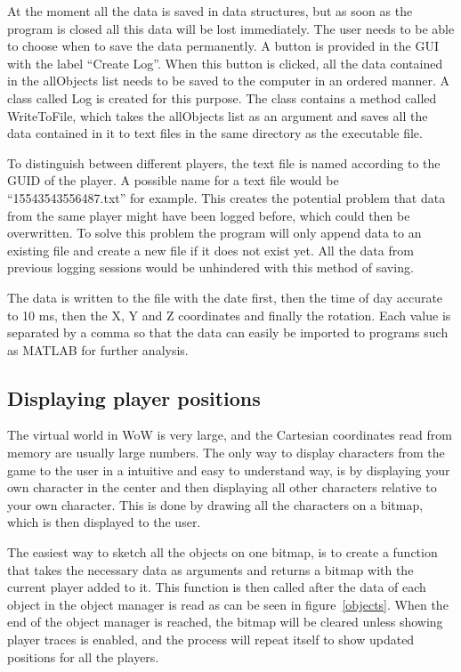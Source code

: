 At the moment all the data is saved in data structures, but as soon as the program is closed all this data will be lost immediately. The user needs to be able to choose when to save the data permanently. A button is provided in the GUI with the label ``Create Log''. When this button is clicked, all the data contained in the allObjects list needs to be saved to the computer in an ordered manner. A class called Log is created for this purpose. The class contains a method called WriteToFile, which takes the allObjects list as an argument and saves all the data contained in it to text files in the same directory as the executable file.

To distinguish between different players, the text file is named according to the GUID of the player. A possible name for a text file would be ``15543543556487.txt'' for example. This creates the potential problem that data from the same player might have been logged before, which could then be overwritten. To solve this problem the program will only append data to an existing file and create a new file if it does not exist  yet. All the data from previous logging sessions would  be unhindered with this method of saving. 

The data is written to the file with the date first, then the time of day accurate to 10 ms, then the X, Y and Z coordinates and finally the rotation. Each value is separated by a comma so that the data can easily be imported to programs such as MATLAB for further analysis.


\subsection{Displaying player positions}


The virtual world in WoW is very large, and the Cartesian coordinates read from memory are usually large numbers. The only way to display characters from the game to the user in a intuitive and easy to understand way, is by displaying your own character in the center and then displaying all other characters relative to your own character. This is done by drawing all the characters on a bitmap, which is then displayed to the user.

The easiest way to sketch all the objects on one bitmap, is to create a function that takes the necessary data as arguments and returns a bitmap with the current player added to it. This function is then called after the data of each object in the object manager is read as can be seen in figure~\ref{objects}. When the end of the object manager is reached, the bitmap will be cleared unless showing player traces is enabled, and the process will repeat itself to show updated positions for all the players.

